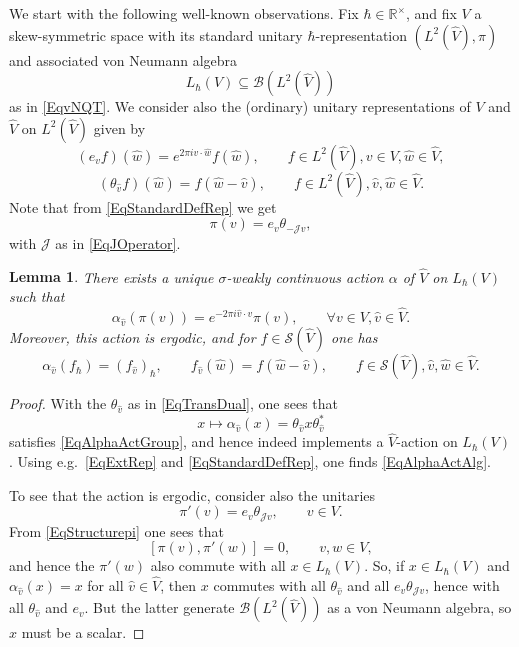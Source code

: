 \documentclass[11pt, reqno]{amsart}
\newtheorem{lemma}[theorem]{Lemma}
\theoremstyle{definition}
\numberwithin{equation}{section}
\def\R{\mathbb R}
\def\Sc{\mathcal S}
\newcommand{\Bc}{\mathcal{B}}
\newcommand{\Jc}{\mathcal{J}}
\begin{document}
We start with the following well-known observations. Fix $\hbar\in \R^{\times}$, and fix $V$ a skew-symmetric space with its standard unitary $\hbar$-representation $(L^2(\hat{V}),\pi)$ and associated von Neumann algebra
\[
L_{\hbar}(V) \subseteq \Bc(L^2(\hat{V}))
\]
as in \eqref{EqvNQT}. We consider also the (ordinary) unitary representations of $V$ and $\hat{V}$ on $L^2(\hat{V})$ given by 
\begin{equation}\label{EqExpoGen}
(e_{v}f)(\hat{w}) = e^{2\pi i v\cdot \hat{w}}f(\hat{w}),\qquad f\in L^2(\hat{V}),v\in V,\hat{w}\in \hat{V},
\end{equation}
\begin{equation}\label{EqTransDual}
(\theta_{\hat{v}}f)(\hat{w}) = f(\hat{w}-\hat{v}),\qquad f\in L^2(\hat{V}),\hat{v},\hat{w}\in \hat{V}.
\end{equation}
Note that from \eqref{EqStandardDefRep} we get
\begin{equation}\label{EqStructurepi}
\pi(v) = e_v \theta_{-\Jc v},
\end{equation}
with $\Jc$ as in \eqref{EqJOperator}.

\begin{lemma}
There exists a unique $\sigma$-weakly continuous action $\alpha$ of $\hat{V}$ on $L_{\hbar}(V)$ such that 
\begin{equation}\label{EqAlphaActGroup}
\alpha_{\hat{v}}(\pi(v)) = e^{-2\pi i \hat{v} \cdot v}\pi(v),\qquad \forall v\in V,\hat{v} \in\hat{V}. 
\end{equation}
Moreover, this action is ergodic, and for $f \in \mathcal{S}(\hat{V})$ one has
\begin{equation}\label{EqAlphaActAlg}
\alpha_{\hat{v}}(f_{\hbar}) = (f_{\hat{v}})_{\hbar},\qquad f_{\hat{v}}(\hat{w}) = f(\hat{w}-\hat{v}),\qquad f\in \Sc(\hat{V}),\hat{v},\hat{w}\in \hat{V}.
\end{equation}

\end{lemma}
\begin{proof}
With the $\theta_{\hat{v}}$ as in \eqref{EqTransDual}, one sees that 
\[
x \mapsto \alpha_{\hat{v}}(x) =  \theta_{\hat{v}}x\theta_{\hat{v}}^*
\]
satisfies \eqref{EqAlphaActGroup}, and hence indeed implements a $\hat{V}$-action on $L_{\hbar}(V)$. Using e.g.\ \eqref{EqExtRep}  and  \eqref{EqStandardDefRep}, one finds \eqref{EqAlphaActAlg}.

To see that the action is ergodic, consider also the unitaries
\[
\pi'(v) = e_v\theta_{\Jc v},\qquad v\in V.
\]
From \eqref{EqStructurepi} one sees that
\[
[\pi(v),\pi'(w)] = 0,\qquad v,w\in V,
\]
and hence the $\pi'(w)$ also commute with all $x\in L_{\hbar}(V)$. So, if $x\in L_{\hbar}(V)$ and $\alpha_{\hat{v}}(x) = x$ for all $\hat{v}\in \hat{V}$, then $x$ commutes with all $\theta_{\hat{v}}$ and all $e_v\theta_{\Jc v}$, hence with all $\theta_{\hat{v}}$ and $e_v$. But the latter generate $\Bc(L^2(\hat{V}))$ as a von Neumann algebra, so $x$ must be a scalar.
\end{proof}
\end{document}
